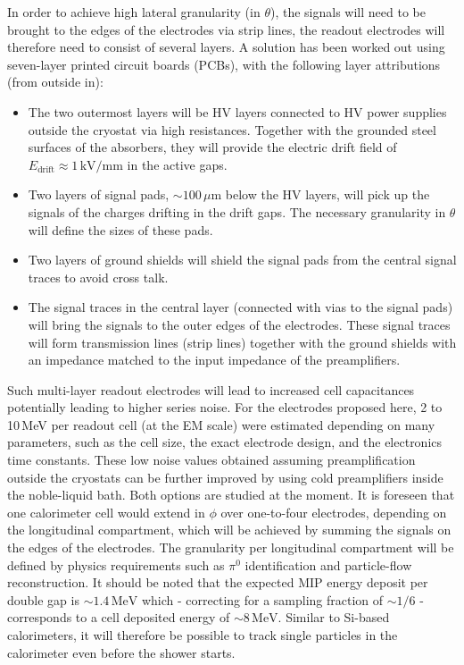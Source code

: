 In order to achieve high lateral granularity (in $\theta$), the signals will need to be brought to the edges of the electrodes via strip lines, the readout electrodes will therefore need to consist of several layers. A solution has been worked out using seven-layer printed circuit boards (PCBs), with the following layer attributions (from outside in): 
\begin{itemize}
\item The two outermost layers will be HV layers connected to HV power supplies outside the cryostat via high resistances. Together with the grounded steel surfaces of the absorbers, they will provide the electric drift field of $E_\mathrm{drift}\approx 1\,\mathrm{kV/mm}$ in the active gaps. 
\item Two layers of signal pads, $\sim 100\,\mu\mathrm{m}$ below the HV layers, will pick up the signals of the charges drifting in the drift gaps. The necessary granularity in $\theta$ will define the sizes of these pads. 
\item Two layers of ground shields will shield the signal pads from the central signal traces to avoid cross talk. 
\item The signal traces in the central layer (connected with vias to the signal pads) will bring the signals to the outer edges of the electrodes. These signal traces will form transmission lines (strip lines) together with the ground shields with an impedance matched to the input impedance of the preamplifiers. 
\end{itemize}
Such multi-layer readout electrodes will lead to increased cell capacitances potentially leading to higher series noise. For the electrodes proposed here, 2 to 10\,MeV per readout cell (at the EM scale) were estimated depending on many parameters, such as the cell size, the exact electrode design, and the electronics time constants. These low noise values obtained assuming preamplification outside the cryostats can be further improved by using cold preamplifiers inside the noble-liquid bath. Both options are studied at the moment. It is foreseen that one calorimeter cell would extend in $\phi$ over one-to-four electrodes, depending on the longitudinal compartment, which will be achieved by summing the signals on the edges of the electrodes. The granularity per longitudinal compartment will be defined by physics requirements such as $\pi^0$ identification and particle-flow reconstruction. It should be noted that the expected MIP energy deposit per double gap is $\sim 1.4\,\mathrm{MeV}$ which - correcting for a sampling fraction of $\sim 1/6$ - corresponds to a cell deposited energy of $\sim 8\,\mathrm{MeV}$. Similar to Si-based calorimeters, it will therefore be possible to track single particles in the calorimeter even before the shower starts. 


